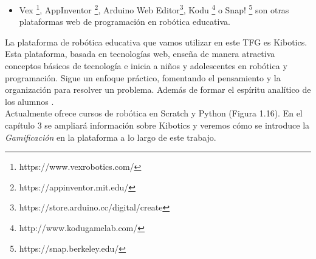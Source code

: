 \begin{itemize}
    \item Vex \footnote{https://www.vexrobotics.com/}, AppInventor \footnote{https://appinventor.mit.edu/}, Arduino Web Editor\footnote{https://store.arduino.cc/digital/create}, Kodu \footnote{http://www.kodugamelab.com/} o Snap! \footnote{https://snap.berkeley.edu/} son otras plataformas web de programación en robótica educativa.
\end{itemize}


La plataforma de robótica educativa que vamos utilizar en este TFG es Kibotics. Esta plataforma, basada en tecnologías web, enseña de manera atractiva conceptos básicos de tecnología e inicia a niños y adolescentes en robótica y programación. Sigue un enfoque práctico, fomentando el pensamiento y la organización para resolver un problema. Además de formar el espíritu analítico de los alumnos \cite{intro}.
\\
Actualmente ofrece cursos de robótica en Scratch y Python (Figura 1.16). En el capítulo 3 se ampliará información sobre Kibotics y veremos cómo se introduce la \textit{Gamificación} en la plataforma a lo largo de este trabajo.

